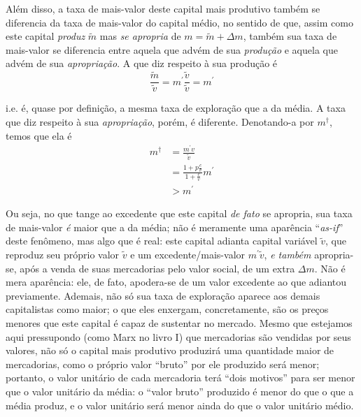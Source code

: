 Além disso, a taxa de mais-valor deste capital mais produtivo também se diferencia da taxa de mais-valor do capital médio, no sentido de que, assim como este capital \textit{produz} $\tilde{m}$ mas \textit{se apropria} de $m = \tilde{m} + \Delta m$, também sua taxa de mais-valor se diferencia entre aquela que advém de sua \textit{produção} e aquela que advém de sua \textit{apropriação}. A que diz respeito à sua produção é
$$
\frac{\tilde{m}}{\tilde{v}} = m^{\prime} \frac{\tilde{v}}{\tilde{v}} = m^{\prime}
$$

i.e. é, quase por definição, a mesma taxa de exploração que a da média. A taxa que diz respeito à sua \textit{apropriação}, porém, é diferente. Denotando-a por $m^{\dagger}$, temos que ela é
\begin{align*}
m^{\dagger} &= \frac{m^{\prime}v}{\tilde{v}}\\
&= \frac{1+p \frac{c}{v}}{1+\frac{c}{v}} m^{\prime} \\
&> m^{\prime}
\end{align*}

Ou seja, no que tange ao excedente que este capital \textit{de fato} se apropria, sua taxa de mais-valor \textit{é} maior que a da média; não é meramente uma aparência ``\textit{as-if}'' deste fenômeno, mas algo que é real: este capital adianta capital variável $\tilde{v}$, que reproduz seu próprio valor $\tilde{v}$ e um excedente/mais-valor $m^{\prime}\tilde{v}$, \textit{e também} apropria-se, após a venda de suas mercadorias pelo valor social, de um extra $\Delta m$. Não é mera aparência: ele, de fato, apodera-se de um valor excedente ao que adiantou previamente. Ademais, não só sua taxa de exploração aparece aos demais capitalistas como maior; o que eles enxergam, concretamente, são os preços menores que este capital é capaz de sustentar no mercado. Mesmo que estejamos aqui pressupondo (como Marx no livro I) que mercadorias são vendidas por seus valores, não só o capital mais produtivo produzirá uma quantidade maior de mercadorias, como o próprio valor ``bruto'' por ele produzido será menor; portanto, o valor unitário de cada mercadoria terá ``dois motivos'' para ser menor que o valor unitário da média: o ``valor bruto'' produzido é menor do que o que a média produz, e o valor unitário será menor ainda do que o valor unitário médio.

